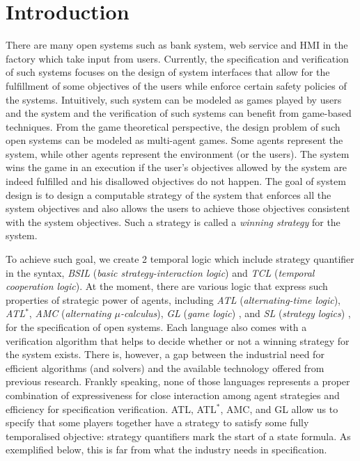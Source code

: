 \chapter{Introduction}
\label{c:intro}

There are many open systems such as bank system, web service and HMI in the factory which take input from users.
Currently, the specification and verification of such systems focuses on the design of system interfaces that allow for the fulfillment of some objectives of the users while enforce certain safety policies of the systems.
Intuitively, such system can be modeled as games played by users and the system and the verification of such systems can benefit from game-based techniques.
From the game theoretical perspective, the design problem of such open systems can be modeled as multi-agent games.
Some agents represent the system, while other agents represent the environment (or the users).
The system wins the game in an execution if the user's objectives allowed by the system are indeed fulfilled and his disallowed objectives do not happen.
The goal of system design is to design a computable strategy of the system that 
enforces all the system objectives and also allows the users to achieve those objectives consistent with the system objectives.
Such a strategy is called a {\em winning strategy} for the system.  

To achieve such goal, we create 2 temporal logic which include strategy quantifier in the syntax, {\em BSIL} ({\em basic strategy-interaction logic}) and {\em TCL} ({\em temporal cooperation logic}).
At the moment, there are various logic that express such properties of strategic power of agents,
including {\em ATL} ({\em alternating-time logic}), 
{\em ATL}$^*$, {\em AMC} ({\em alternating $\mu$-calculus}),
{\em GL} ({\em game logic}) \cite{AHK02}, 
and {\em SL} ({\em strategy logics}) \cite{CLM10,CHP10,MMV10}, 
for the specification of open systems.  
Each language also comes with a verification algorithm that helps to decide whether or not a winning strategy for the system exists.
There is, however, a gap between the industrial need for efficient algorithms (and solvers) and the available technology offered from previous research.
Frankly speaking, none of those languages represents a proper combination of expressiveness for close interaction among agent strategies and efficiency for specification verification.  
ATL, ATL$^*$, AMC, and GL \cite{AHK02} allow us to specify that some players together have a strategy to satisfy some fully temporalised objective: strategy quantifiers mark the start of a state formula.
As exemplified below, this is far from what the industry needs in specification.  

